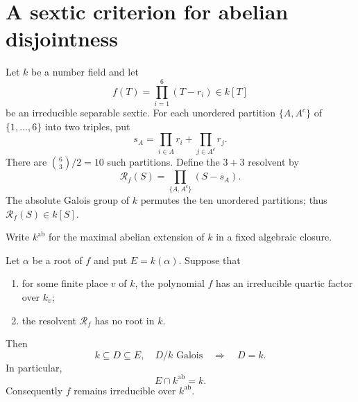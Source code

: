 \section{A sextic criterion for abelian disjointness}
\label{sec:sextic-abelian-criterion}

Let $k$ be a number field and let
\[
 f(T)=\prod_{i=1}^6(T-r_i)\in k[T]
\]
be an irreducible separable sextic.  For each unordered partition
$\{A,A^c\}$ of $\{1,\ldots,6\}$ into two triples, put
\[
 s_A=\prod_{i\in A}r_i+\prod_{j\in A^c}r_j.
\]
There are $\binom63/2=10$ such partitions.  Define the $3+3$ resolvent
by
\begin{equation}
 \mathcal R_f(S)=
 \prod_{\{A,A^c\}}(S-s_A).
 \label{eq:abstract-three-three-resolvent}
\end{equation}
The absolute Galois group of $k$ permutes the ten unordered partitions;
thus $\mathcal R_f(S)\in k[S]$.

Write $k^{\mathrm{ab}}$ for the maximal abelian extension of $k$ in a
fixed algebraic closure.

\begin{theorem}
\label{thm:sextic-abelian-disjointness}
Let $\alpha$ be a root of $f$ and put $E=k(\alpha)$.  Suppose that
\begin{enumerate}[label=\textup{(\roman*)}]
 \item for some finite place $v$ of $k$, the polynomial $f$ has an
       irreducible quartic factor over $k_v$;
 \item the resolvent $\mathcal R_f$ has no root in $k$.
\end{enumerate}
Then
\[
 k\subseteq D\subseteq E,\quad D/k\text{ Galois}
 \quad\Longrightarrow\quad D=k.
\]
In particular,
\[
 E\cap k^{\mathrm{ab}}=k.
\]
Consequently $f$ remains irreducible over $k^{\mathrm{ab}}$.
\end{theorem}

